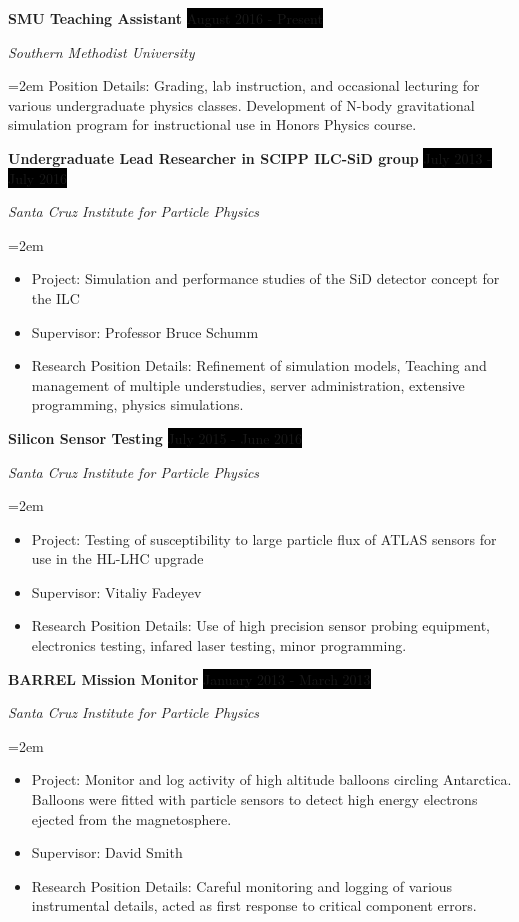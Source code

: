 \documentclass[paper=a4,fontsize=11pt]{scrartcl} %
\newcommand{\sepspace}{\vspace*{1em}}		%
\newcommand{\EducationEntry}[4]{
		\noindent \textbf{#1} \hfill      %
		\colorbox{Black}{%
			\parbox{6em}{%
			\hfill\color{White}#2}} \par  %
		\noindent \textit{#3} \par        %
		\noindent\hangindent=2em\hangafter=0 \small #4 %
		\normalsize \par}
\newcommand{\WorkEntry}[4]{				  %
		\noindent \textbf{#1} \hfill      %
		\colorbox{Black}{\color{White}#2} \par  %
		\noindent \textit{#3} \par              %
		\noindent\hangindent=2em\hangafter=0 \small #4 %
		\normalsize \par}
\begin{document}
    \WorkEntry {SMU Teaching Assistant}
        {August 2016 - Present}
        {Southern Methodist University}
        { Position Details:
            Grading, lab instruction, and occasional lecturing for various undergraduate physics classes. Development of N-body gravitational simulation program for instructional use in Honors Physics course.
        }
    \sepspace

    \WorkEntry {Undergraduate Lead Researcher in SCIPP ILC-SiD group}
        {July 2013 - July 2016}
        {Santa Cruz Institute for Particle Physics}
        {\begin{itemize}
            \item[] Project:
                Simulation and performance studies of the SiD detector concept for the ILC
            \item[] Supervisor:
                Professor Bruce Schumm
            \item[] Research Position Details:
                Refinement of simulation models, Teaching and management 
                of multiple understudies, server administration,
                extensive programming, physics simulations.
        \end{itemize}}
    \sepspace

    \WorkEntry {Silicon Sensor Testing}
        {July 2015 - June 2016}
        {Santa Cruz Institute for Particle Physics}
        {\begin{itemize}
            \item[] Project:
                Testing of susceptibility to large particle
                flux of ATLAS sensors for use in the HL-LHC upgrade
            \item[] Supervisor: 
                Vitaliy Fadeyev
            \item[] Research Position Details:
                Use of high precision sensor probing equipment,
                electronics testing, infared laser testing, minor programming.
        \end{itemize}}
    \sepspace

    \WorkEntry {BARREL Mission Monitor}
        {January 2013 - March 2013}
        {Santa Cruz Institute for Particle Physics}
        {\begin{itemize}
            \item[] Project:
                Monitor and log activity of high altitude balloons circling Antarctica.
                Balloons were fitted with particle sensors to detect high energy electrons
                ejected from the magnetosphere.
            \item[] Supervisor: 
                David Smith
            \item[] Research Position Details:
                Careful monitoring and logging of various instrumental details,
                acted as first response to critical component errors.
        \end{itemize}}
    \sepspace
\end{document}
